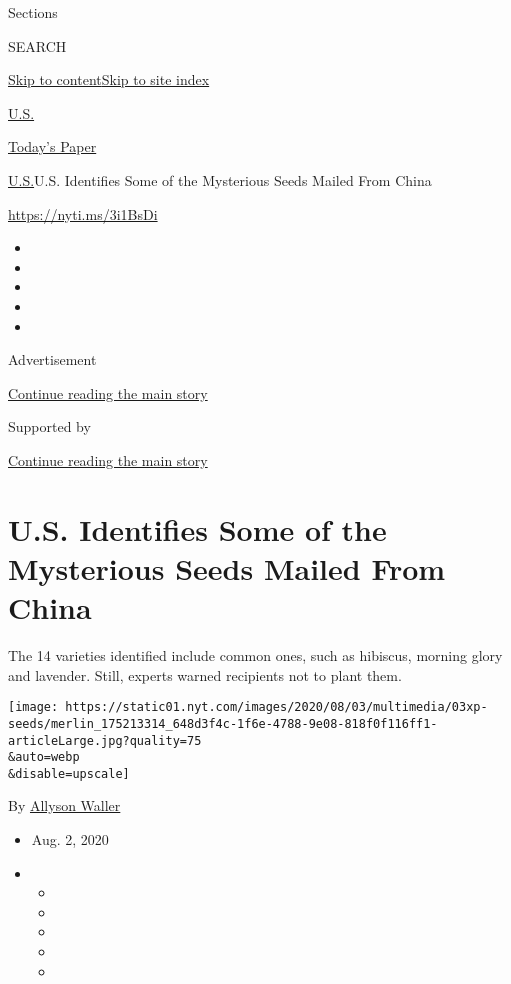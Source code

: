 Sections

SEARCH

\protect\hyperlink{site-content}{Skip to
content}\protect\hyperlink{site-index}{Skip to site index}

\href{https://www.nytimes.com/section/us}{U.S.}

\href{https://myaccount.nytimes.com/auth/login?response_type=cookie\&client_id=vi}{}

\href{https://www.nytimes.com/section/todayspaper}{Today's Paper}

\href{/section/us}{U.S.}\textbar{}U.S. Identifies Some of the Mysterious
Seeds Mailed From China

\url{https://nyti.ms/3i1BsDi}

\begin{itemize}
\item
\item
\item
\item
\item
\end{itemize}

Advertisement

\protect\hyperlink{after-top}{Continue reading the main story}

Supported by

\protect\hyperlink{after-sponsor}{Continue reading the main story}

\hypertarget{us-identifies-some-of-the-mysterious-seeds-mailed-from-china}{%
\section{U.S. Identifies Some of the Mysterious Seeds Mailed From
China}\label{us-identifies-some-of-the-mysterious-seeds-mailed-from-china}}

The 14 varieties identified include common ones, such as hibiscus,
morning glory and lavender. Still, experts warned recipients not to
plant them.

\texttt{[image: https://static01.nyt.com/images/2020/08/03/multimedia/03xp-seeds/merlin\_175213314\_648d3f4c-1f6e-4788-9e08-818f0f116ff1-articleLarge.jpg?quality=75\\\&auto=webp\\\&disable=upscale]}

By \href{https://www.nytimes.com/by/allyson-waller}{Allyson Waller}

\begin{itemize}
\item
  Aug. 2, 2020
\item
  \begin{itemize}
  \item
  \item
  \item
  \item
  \item
  \end{itemize}
\end{itemize}

